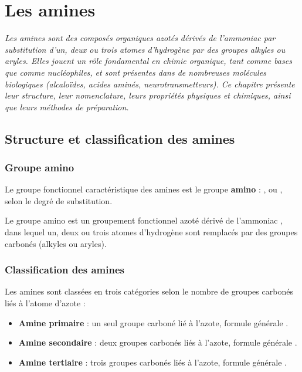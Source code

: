 \chapter{Les amines}

\textit{Les amines sont des composés organiques azotés dérivés de l'ammoniac par substitution d'un, deux ou trois atomes d'hydrogène par des groupes alkyles ou aryles. Elles jouent un rôle fondamental en chimie organique, tant comme bases que comme nucléophiles, et sont présentes dans de nombreuses molécules biologiques (alcaloïdes, acides aminés, neurotransmetteurs). Ce chapitre présente leur structure, leur nomenclature, leurs propriétés physiques et chimiques, ainsi que leurs méthodes de préparation.}

\section{Structure et classification des amines}

\subsection{Groupe amino}

Le groupe fonctionnel caractéristique des amines est le groupe \textbf{amino} : ,  ou , selon le degré de substitution.

\begin{definition}
Le groupe amino est un groupement fonctionnel azoté dérivé de l'ammoniac , dans lequel un, deux ou trois atomes d'hydrogène sont remplacés par des groupes carbonés (alkyles ou aryles).
\end{definition}

\subsection{Classification des amines}

Les amines sont classées en trois catégories selon le nombre de groupes carbonés liés à l'atome d'azote :

\begin{itemize}
    \item \textbf{Amine primaire} : un seul groupe carboné lié à l'azote, formule générale .
    \item \textbf{Amine secondaire} : deux groupes carbonés liés à l'azote, formule générale .
    \item \textbf{Amine tertiaire} : trois groupes carbonés liés à l'azote, formule générale .
\end{itemize}

